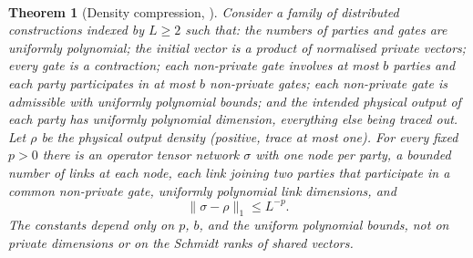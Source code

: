 \documentclass[aps,prx,reprint,superscriptaddress,floatfix,nofootinbib,longbibliography,amsmath,amssymb]{revtex4-2}
\newcommand{\norm}[1]{\lVert #1\rVert}
\theoremstyle{plain}
\newtheorem{theorem}{Theorem}[section]
\theoremstyle{definition}
\newcommand{\precisely}{\par\noindent{\bfseries Precisely.}\ }
\begin{document}
\precisely
\begin{theorem}[Density compression, {\cite[Theorem~5.2]{PP}}]\label{thm:compression}
Consider a family of distributed constructions indexed by $L\ge2$ such
that: the numbers of parties and gates are uniformly polynomial; the
initial vector is a product of normalised private vectors; every gate is
a contraction; each non-private gate involves at most $b$ parties and each
party participates in at most $b$ non-private gates; each non-private gate
is admissible with uniformly polynomial bounds; and the intended physical
output of each party has uniformly polynomial dimension, everything else
being traced out. Let $\rho$ be the physical output density (positive,
trace at most one). For every fixed $p>0$ there is an operator tensor
network $\sigma$ with one node per party, a bounded number of links at
each node, each link joining two parties that participate in a common
non-private gate, uniformly polynomial link dimensions, and
\[
 \norm{\sigma-\rho}_1\le L^{-p}.
\]
The constants depend only on $p$, $b$, and the uniform polynomial bounds,
not on private dimensions or on the Schmidt ranks of shared vectors.
\end{theorem}
\end{document}
